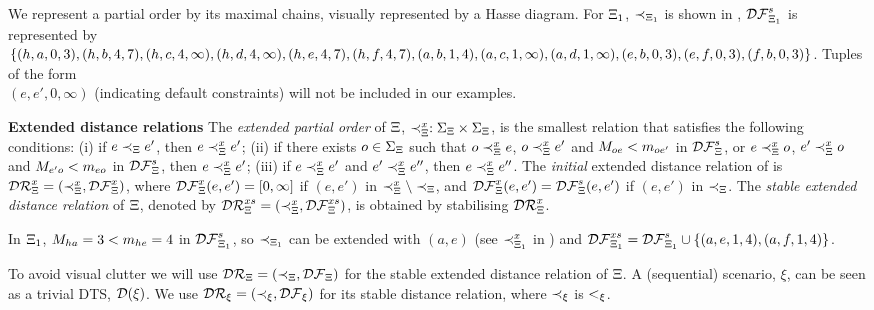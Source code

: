 We represent a partial order by its maximal chains, visually
represented by a Hasse diagram. For $\Xi_1$,
$\prec_{\Xi_1}$ is shown in ,
$\mathcal{DF}_{\Xi_1}^{s}$ is represented by
$\{(h, a, 0, 3),
(h, b, 4, 7),
(h, c, 4, \infty),
(h, d, 4, \infty),
(h, e, 4, 7),
(h, f, 4, 7),
(a, b, 1, 4),\\
(a, c, 1, \infty),
(a, d, 1, \infty),
(e, b, 0, 3),
(e, f, 0, 3),
(f, b, 0, 3)\}$.
Tuples of the form\\ $(e,e',0,\infty)$ (indicating default
constraints) will not be included in our examples.

{\bf Extended distance relations}
The \emph{extended partial order} of $\Xi$,
$\prec_{\Xi}^{x}: \Sigma_{\Xi} \times  \Sigma_{\Xi}$,
is the smallest relation
that satisfies the following conditions: (i) if
$e\prec_{\Xi}e'$, then $e\prec_{\Xi}^{x}e'$; (ii) if there
exists $o\in\Sigma_{\Xi}$ such that $o\prec_{\Xi}^{x}e$,
$o\prec_{\Xi}^{x}e'$ and $M_{o e} < m_{o e'}$
 in $\mathcal{DF}_{\Xi}^{s}$,
or $e\prec_{\Xi}^{x}o$, $e'\prec_{\Xi}^{x}o$ and $M_{e' o}
< m_{e o}$ in $\mathcal{DF}_{\Xi}^{s}$, then $e\prec_{\Xi}^{x}e'$;
(iii) if $e\prec_{\Xi}^{x}e'$ and  $e'\prec_{\Xi}^{x}e''$, then
$e\prec_{\Xi}^{x}e''$.
The \emph{initial} extended distance relation of \DScenario{} is
 $\mathcal{DR}_{\Xi}^x=(\prec_{\Xi}^{x},\mathcal{DF}_{\Xi}^{x})$,
where
    $\mathcal{DF}_{\Xi}^{x}(e, e') = [0,\infty]$ if
$(e,e')$ in $\prec_{\Xi}^{x}\setminus \prec_{\Xi}$,
and $\mathcal{DF}_{\Xi}^{x}(e, e') = \mathcal{DF}_{\Xi}^{s}(e, e')$ if
 $(e,e')$ in $\prec_{\Xi}$.
The \emph{stable extended distance relation} of $\Xi$,
denoted by $\mathcal{DR}_{\Xi}^{xs}=(\prec_{\Xi}^{x},\mathcal{DF}_{\Xi}^{xs})$, is
obtained by stabilising $\mathcal{DR}_{\Xi}^x$.

In $\Xi_1$, $M_{h a}=3 < m_{h e}=4$ in $\mathcal{DF}_{\Xi_1}^{s}$,
so $\prec_{\Xi_1}$ can be extended with $(a,e)$ (see
$\prec_{\Xi_1}^{x}$ in ) and
$\mathcal{DF}_{\Xi_1}^{xs}=\mathcal{DF}_{\Xi_1}^{s}\cup\{(a,e,1,4),(a,f,1,4)\}$.

To avoid visual clutter
we will use
$\mathcal{DR}_{\Xi}=(\prec_{\Xi},\mathcal{DF}_{\Xi})$ for the stable
extended distance relation of $\Xi$.
A (sequential) scenario, $\xi$, can be seen as a trivial DTS,
$\mathcal{D}(\xi)$. We use $\mathcal{DR}_{\xi}=(\prec_{\xi},\mathcal{DF}_{\xi})$ for its stable
distance relation, where $\prec_{\xi}$ is $<_{\xi}$.

